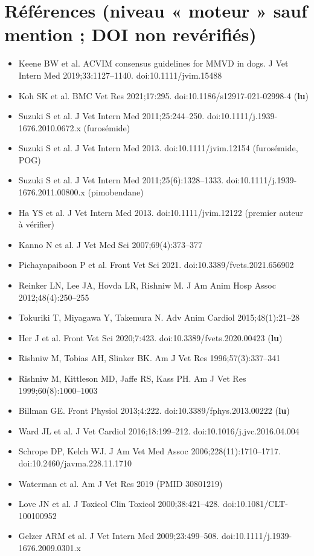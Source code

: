 \documentclass[10pt,a4paper]{article}
\begin{document}
\section*{Références (niveau « moteur » sauf mention ; DOI non revérifiés)}
\small
\begin{itemize}
\item Keene BW et al. ACVIM consensus guidelines for MMVD in dogs. J Vet Intern Med 2019;33:1127--1140. doi:10.1111/jvim.15488
\item Koh SK et al. BMC Vet Res 2021;17:295. doi:10.1186/s12917-021-02998-4 (\textbf{lu})
\item Suzuki S et al. J Vet Intern Med 2011;25:244--250. doi:10.1111/j.1939-1676.2010.0672.x (furosémide)
\item Suzuki S et al. J Vet Intern Med 2013. doi:10.1111/jvim.12154 (furosémide, POG)
\item Suzuki S et al. J Vet Intern Med 2011;25(6):1328--1333. doi:10.1111/j.1939-1676.2011.00800.x (pimobendane)
\item Ha YS et al. J Vet Intern Med 2013. doi:10.1111/jvim.12122 (premier auteur à vérifier)
\item Kanno N et al. J Vet Med Sci 2007;69(4):373--377
\item Pichayapaiboon P et al. Front Vet Sci 2021. doi:10.3389/fvets.2021.656902
\item Reinker LN, Lee JA, Hovda LR, Rishniw M. J Am Anim Hosp Assoc 2012;48(4):250--255
\item Tokuriki T, Miyagawa Y, Takemura N. Adv Anim Cardiol 2015;48(1):21--28
\item Her J et al. Front Vet Sci 2020;7:423. doi:10.3389/fvets.2020.00423 (\textbf{lu})
\item Rishniw M, Tobias AH, Slinker BK. Am J Vet Res 1996;57(3):337--341
\item Rishniw M, Kittleson MD, Jaffe RS, Kass PH. Am J Vet Res 1999;60(8):1000--1003
\item Billman GE. Front Physiol 2013;4:222. doi:10.3389/fphys.2013.00222 (\textbf{lu})
\item Ward JL et al. J Vet Cardiol 2016;18:199--212. doi:10.1016/j.jvc.2016.04.004
\item Schrope DP, Kelch WJ. J Am Vet Med Assoc 2006;228(11):1710--1717. doi:10.2460/javma.228.11.1710
\item Waterman et al. Am J Vet Res 2019 (PMID 30801219)
\item Love JN et al. J Toxicol Clin Toxicol 2000;38:421--428. doi:10.1081/CLT-100100952
\item Gelzer ARM et al. J Vet Intern Med 2009;23:499--508. doi:10.1111/j.1939-1676.2009.0301.x

\end{itemize}
\end{document}
